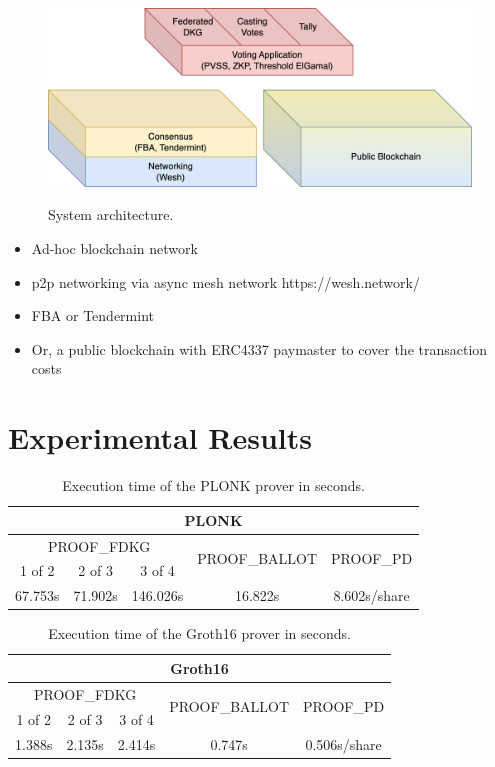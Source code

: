 \documentclass{article}
\begin{document}
\begin{figure}
    \centering
    \includegraphics[width=\textwidth]{stack-bc.png}
    \label{fig:stack-bc}
    \caption{System architecture.}
\end{figure}

\begin{itemize}
    \item Ad-hoc blockchain network
    \item p2p networking via async mesh network https://wesh.network/
    \item FBA or Tendermint
    \item Or, a public blockchain with ERC4337 paymaster to cover the transaction costs
\end{itemize}

\section{Experimental Results}

\begin{table}
\centering
\label{table:plonk-time}
\caption{Execution time of the PLONK prover in seconds.}
\begin{tabular}{|c|c|c|c|c|}
    \hline
    \multicolumn{5}{|c|}{PLONK} \\
    \hline
    \multicolumn{3}{|c|}{\textrm{PROOF}_\textrm{FDKG}} & \multirow{2}{*}{\textrm{PROOF}_\textrm{BALLOT}} & \multirow{2}{*}{\textrm{PROOF}_\textrm{PD}} \\
    \cline{1-3}
    1 of 2 & 2 of 3 & 3 of 4 & & \\
    \hline
    67.753s & 71.902s & 146.026s & 16.822s & 8.602s/share\\
    \hline
\end{tabular}
\end{table}

\begin{table}
\centering
\label{table:groth16-time}
\caption{Execution time of the Groth16 prover in seconds.}
\begin{tabular}{|c|c|c|c|c|}
    \hline
    \multicolumn{5}{|c|}{Groth16} \\
    \hline
    \multicolumn{3}{|c|}{\textrm{PROOF}_\textrm{FDKG}} & \multirow{2}{*}{\textrm{PROOF}_\textrm{BALLOT}} & \multirow{2}{*}{\textrm{PROOF}_\textrm{PD}} \\
    \cline{1-3}
    1 of 2 & 2 of 3 & 3 of 4 & & \\
    \hline
    1.388s & 2.135s & 2.414s & 0.747s & 0.506s/share\\
    \hline
\end{tabular}
\end{table}
\end{document}

